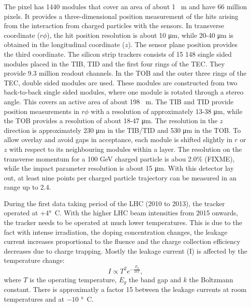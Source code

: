  
 The pixel has 1440 modules that cover an area of about 1 \si{ \squared \meter} and have 66 million pixels. It provides a three-dimensional position measurement of the hits arising from the interaction from charged particles with the sensors. In transverse coordinate ($r\phi$), the hit position resolution is about 10 \si{ \micro \meter}, while 20-40 \si{ \micro \meter} is obtained in the longitudinal coordinate ($z$). The sensor plane position provides the third coordinate. 
  The silicon strip trackers consists of 15 148 single sided modules placed in the TIB, TID and the first four rings of the TEC. They provide 9.3 million readout channels. In the TOB and the outer three rings of the TEC, double sided modules are used. These modules are constructed from two back-to-back single sided modules, where one module is rotated through a stereo angle.  This covers an active area of about 198 \si{ \squared  \meter}. The TIB and TID provide position measurements in $r\phi$ with a resolution of approximately 13-38 \si{ \micro \meter}, while the TOB provides a resolution of about 18-47 \si{ \micro \meter}. The resolution in the  $z$ direction is approximately 230  \si{ \micro \meter} in the TIB/TID and 530  \si{ \micro \meter} in the TOB. To allow overlay and avoid gaps in acceptance, each module is shifted slightly in $r$ or $z$ with respect to its neighbouring modules within a layer. The resolution on the transverse momentum for a 100 \si{ \GeV} charged particle is abou 2.0\% (FIXME), while the impact parameter resolution is about 15 \si{ \micro \meter}. With this detector lay out, at least nine points per charged particle trajectory can be measured in an \abspsrap range up to 2.4.
  
   During the first data taking period of the LHC (2010 to 2013), the tracker operated at +4\si{ \degree C}. With the higher LHC beam intensities from 2015 onwards, the tracker needs to be operated at much lower temperatures. This is due to the fact with intense irradiation, the doping concentration changes, the leakage current increases proportional to the fluence and the charge collection efficiency decreases due to charge trapping. Mostly the leakage current (I) is affected by the temperature change: 
   \begin{equation}
   I \propto T^2 e^{-\frac{E_g}{2kT}}, 
   \end{equation}
    where $T$ is the operating temperature, $E_g$ the band gap and $k$ the Boltzmann constant. There is approximatly a factor 15 between the leakage currents at room temperatures and at $-10$ \si{ \degree C}. 
    
